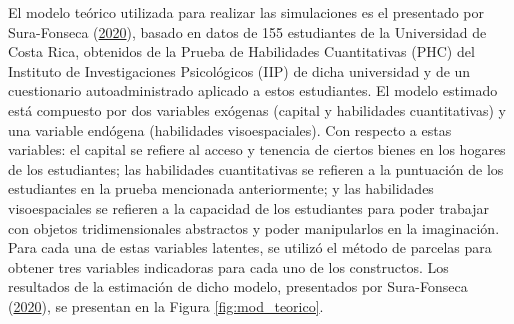 \documentclass[
  english]{revcoles}
\begin{document}
El modelo teórico utilizada para realizar las simulaciones es el
presentado por Sura-Fonseca
(\protect\hyperlink{ref-SuraFonseca2020}{2020}), basado en datos de 155
estudiantes de la Universidad de Costa Rica, obtenidos de la Prueba de
Habilidades Cuantitativas (PHC) del Instituto de Investigaciones
Psicológicos (IIP) de dicha universidad y de un cuestionario
autoadministrado aplicado a estos estudiantes. El modelo estimado está
compuesto por dos variables exógenas (capital y habilidades
cuantitativas) y una variable endógena (habilidades visoespaciales). Con
respecto a estas variables: el capital se refiere al acceso y tenencia
de ciertos bienes en los hogares de los estudiantes; las habilidades
cuantitativas se refieren a la puntuación de los estudiantes en la
prueba mencionada anteriormente; y las habilidades visoespaciales se
refieren a la capacidad de los estudiantes para poder trabajar con
objetos tridimensionales abstractos y poder manipularlos en la
imaginación. Para cada una de estas variables latentes, se utilizó el
método de parcelas para obtener tres variables indicadoras para cada uno
de los constructos. Los resultados de la estimación de dicho modelo,
presentados por Sura-Fonseca
(\protect\hyperlink{ref-SuraFonseca2020}{2020}), se presentan en la
Figura \ref{fig:mod_teorico}.
\end{document}
